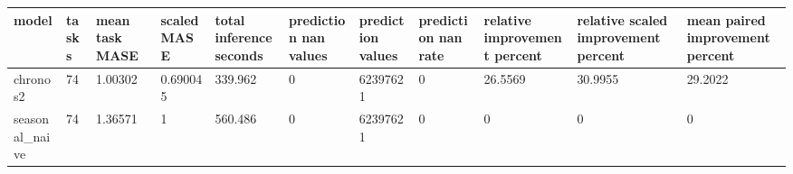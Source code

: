 \begin{tabular}{lllllllllll}
\toprule
model & tasks & mean task MASE & scaled MASE & total inference seconds & prediction nan values & prediction values & prediction nan rate & relative improvement percent & relative scaled improvement percent & mean paired improvement percent \\
\midrule
chronos2 & 74 & 1.00302 & 0.690045 & 339.962 & 0 & 62397621 & 0 & 26.5569 & 30.9955 & 29.2022 \\
seasonal\_naive & 74 & 1.36571 & 1 & 560.486 & 0 & 62397621 & 0 & 0 & 0 & 0 \\
\bottomrule
\end{tabular}

